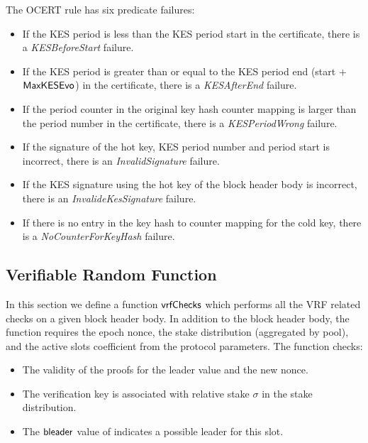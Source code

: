 The OCERT rule has six predicate failures:
\begin{itemize}
\item If the KES period is less than the KES period start in the certificate,
  there is a \emph{KESBeforeStart} failure.
\item If the KES period is greater than or equal to the KES period end (start +
  $\mathsf{MaxKESEvo}$) in the certificate, there is a \emph{KESAfterEnd} failure.
\item If the period counter in the original key hash counter mapping is larger
  than the period number in the certificate, there is a \emph{KESPeriodWrong}
  failure.
\item If the signature of the hot key, KES period number and period start is
  incorrect, there is an \emph{InvalidSignature} failure.
\item If the KES signature using the hot key of the block header body is
  incorrect, there is an \emph{InvalideKesSignature} failure.
\item If there is no entry in the key hash to counter mapping for the cold key,
  there is a \emph{NoCounterForKeyHash} failure.
\end{itemize}

\subsection{Verifiable Random Function}
\label{sec:verif-rand-funct}

In this section we define a function $\mathsf{vrfChecks}$ which performs all the VRF related checks
on a given block header body.
In addition to the block header body, the function requires the epoch nonce,
the stake distribution (aggregated by pool), and the active slots coefficient from the protocol
parameters. The function checks:

\begin{itemize}
\item The validity of the proofs for the leader value and the new nonce.
\item The verification key is associated with relative stake $\sigma$ in the stake distribution.
\item The $\mathsf{bleader}$ value of  indicates a possible leader for
  this slot.
\end{itemize}

